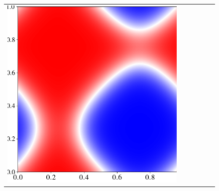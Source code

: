 \documentclass[12pt, reqno]{report}
\theoremstyle{definition}
\theoremstyle{remark}
\begin{document}
\begin{figure}[H]
\begin{tabular}{rccccc}
        \includegraphics[align = c, height=\subheight]{media_paper/end_AC_cmap_FD_n=1000.png} \\


\end{tabular}
\end{figure}
\end{document}
